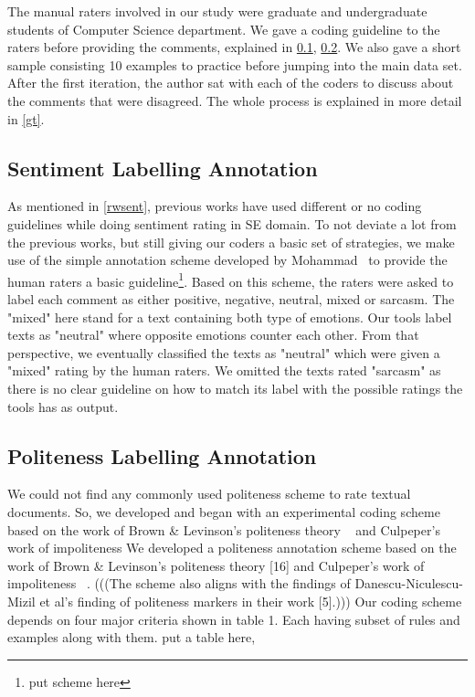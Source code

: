 The manual raters involved in our study were graduate and undergraduate students of Computer Science department. We gave a coding guideline to the raters before providing the comments, explained in \ref{sentscheme}, \ref{polscheme}. We also gave a short sample consisting 10 examples to practice before jumping into the main data set. After the first iteration, the author sat with each of the coders to discuss about the comments that were disagreed. The whole process is explained in more detail in \ref{gt}.

\subsection{Sentiment Labelling Annotation}\label{sentscheme}

As mentioned in \ref{rwsent}, previous works have used different or no coding guidelines while doing sentiment rating in SE domain. To not deviate a lot from the previous works, but still giving our coders a basic set of strategies, we make use of the simple annotation scheme developed by Mohammad~\cite{mohammad2016practical} to provide the human raters a basic guideline\footnote{put scheme here}. Based on this scheme, the raters were asked to label each comment as either positive, negative, neutral, mixed or sarcasm. The "mixed" here stand for a text containing both type of emotions. Our tools label texts as "neutral" where opposite emotions counter each other. From that perspective, we eventually classified the texts as "neutral" which were given a "mixed" rating by the human raters. We omitted the texts rated "sarcasm" as there is no clear guideline on how to match its label with the possible ratings the tools has as output.

\subsection{Politeness Labelling Annotation}\label{polscheme}

We could not find any commonly used politeness scheme to rate textual documents. So, we developed and began with an experimental coding scheme based on the work of Brown \& Levinson's politeness theory ~\cite{brown1987politeness} and Culpeper's work of impoliteness
We developed a politeness annotation scheme based on the work of Brown \& Levinson’s politeness theory [16] and Culpeper’s work of impoliteness ~\cite{culpeper1996towards}. (((The scheme also aligns with the findings of Danescu-Niculescu-Mizil et al’s finding of politeness markers in their work [5].))) Our coding scheme depends on four major criteria shown in table 1. Each having subset of rules and examples along with them. put a table here,

